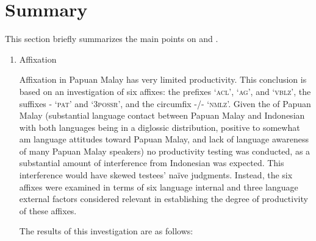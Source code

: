  
 \newpage 
\section{Summary}\label{Para_3.3}
\largerpage
This section briefly summarizes the main points on  and .


\begin{enumerate}
\item 
Affixation


Affixation in Papuan Malay has very limited productivity. This conclusion is based on an investigation of six affixes: the prefixes  ‘\textsc{acl}’,  ‘\textsc{ag}’, and  ‘\textsc{vblz}’, the suffixes - ‘\textsc{pat}’ and  ‘\textsc{3possr}’, and the circumfix -/- ‘\textsc{nmlz}’. Given the  of Papuan Malay (substantial language contact between Papuan Malay and Indonesian with both languages being in a diglossic distribution, positive to somewhat am language attitudes toward Papuan Malay, and lack of language awareness of many Papuan Malay speakers) no productivity testing was conducted, as a substantial amount of interference from Indonesian was expected. This interference would have skewed testees’ naïve judgments. Instead, the six affixes were examined in terms of six language internal and three language external factors considered relevant in establishing the degree of productivity of these affixes.



The results of this investigation are as follows:
\begin{enumerate}


\end{enumerate}
\end{enumerate}
